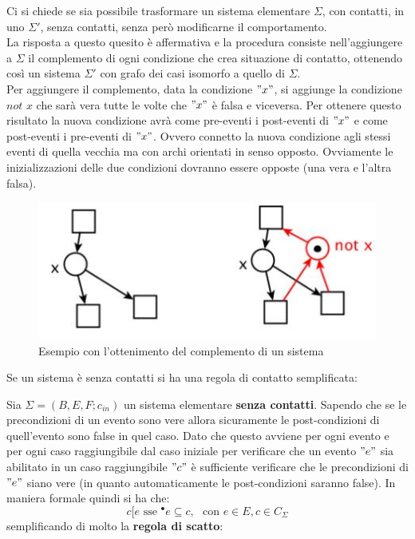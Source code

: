 Ci si chiede se sia possibile trasformare un sistema elementare $\Sigma$, con
contatti, in uno $\Sigma'$, senza contatti, senza però modificarne il
comportamento.\\
La risposta a questo quesito è affermativa e la procedura consiste
nell'aggiungere a $\Sigma$ il complemento di ogni condizione che crea situazione
di contatto, ottenendo così un sistema $\Sigma'$ con grafo dei casi isomorfo a
quello di $\Sigma$.\\ 
Per aggiungere il complemento, data la condizione $"x"$, si aggiunge la condizione
$not\,\, x$ che sarà vera tutte le volte che $"x"$ è falsa e viceversa. Per
ottenere questo risultato la nuova condizione avrà come pre-eventi i
post-eventi di $"x"$ e come post-eventi i pre-eventi di $"x"$. Ovvero
connetto la nuova condizione agli stessi eventi di quella vecchia ma con archi
orientati in senso opposto. Ovviamente le inizializzazioni delle due condizioni
dovranno essere opposte (una vera e l'altra falsa).
\begin{figure}[H]
  \centering
  \includegraphics[scale = 0.6]{img/con2.jpg}
  \caption{Esempio con l'ottenimento del complemento di un sistema}
\end{figure}
Se un sistema è senza contatti si ha una regola di contatto semplificata:
\begin{definizione}
  Sia $\Sigma = (B, E, F;c_{in})$ un sistema elementare \textbf{senza
    contatti}. Sapendo che se le precondizioni di un evento sono vere allora
  sicuramente le post-condizioni di quell'evento sono false in quel caso. Dato
  che questo avviene per ogni evento e per ogni caso raggiungibile dal caso
  iniziale per verificare che un evento $"e"$ sia abilitato in un caso
  raggiungibile $"c"$ è sufficiente verificare che le precondizioni di $"e"$ siano
  vere (in quanto automaticamente le post-condizioni saranno false). In
  maniera formale quindi si ha che: 
  \[c[e\mbox{ sse } ^\bullet e\subseteq c,\,\,\mbox{ con } e\in E, c\in
    C_\Sigma\]
  semplificando di molto la \textbf{regola di scatto}:
\end{definizione} \vspace{5mm} %
